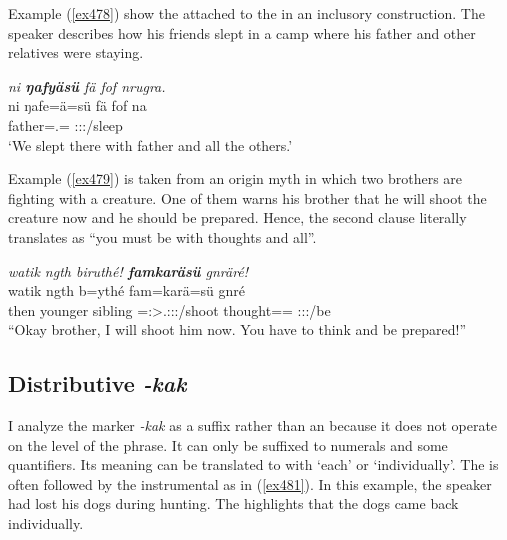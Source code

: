 Example (\ref{ex478}) show the   attached to the   in an inclusory construction. The speaker describes how his friends slept in a camp where his father and other relatives were staying.

\begin{exe}
	\ex \emph{ni \textbf{ŋafyäsü} fä fof nrugra.}\\
	\gll ni ŋafe=ä=sü fä fof na\\
	\Fnsg{} father=\Assoc.\Pl=\Etc{} \Dist{} \Emph{} \Fpl:\Sbj:\Pst:\Ipfv/sleep\\
	\trans `We slept there with father and all the others.'
	\label{ex478}
\end{exe}
	
Example (\ref{ex479}) is taken from an origin myth in which two brothers are fighting with a creature. One of them warns his brother that he will shoot the creature now and he should be prepared. Hence, the second clause literally translates as ``you must be with thoughts and all''.

\begin{exe}
	\ex \emph{watik ngth biruthé! \textbf{famkaräsü} gnräré!}\\
	\gll watik ngth b=ythé fam=karä=sü gnré\\
	then {younger sibling} \Med=\Fsg:\Sbj>\Tsg.\Masc:\Obj:\Nonpast:\Ipfv/shoot thought=\Prop=\Etc{} \Ssg:\Sbj:\Imp:\Ipfv/be\\
	\trans ``Okay brother, I will shoot him now. You have to think and be prepared!''\\
	\label{ex479}
\end{exe}

\subsection{Distributive \emph{-kak}} \label{distributivekak}

I analyze the  marker \emph{-kak} as a suffix rather than an  because it does not operate on the level of the phrase. It can only be suffixed to numerals and some quantifiers. Its meaning can be translated to  with `each' or `individually'. The  is often followed by the instrumental as in (\ref{ex481}). In this example, the speaker had lost his dogs during hunting. The  highlights that the dogs came back individually.

